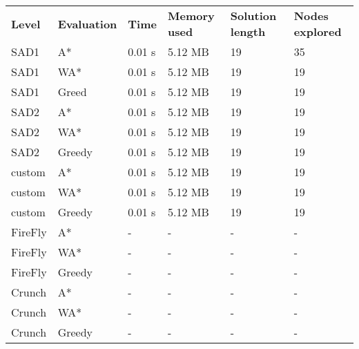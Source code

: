 \documentclass[Main]{subfiles}
\begin{document}
\begin{table}[h]
\begin{tabular}{llllll}
\rowcolor[HTML]{EFEFEF} 
\textbf{Level} & \textbf{Evaluation} & \textbf{Time} & \textbf{Memory used} & \textbf{Solution length} & \textbf{Nodes explored} \\
SAD1           & A*                  & 0.01 s        & 5.12 MB              & 19                       & 35                      \\
SAD1           & WA*                 & 0.01 s        & 5.12 MB              & 19                       & 19                      \\
SAD1           & Greed               & 0.01 s        & 5.12 MB              & 19                       & 19                      \\
SAD2           & A*                  & 0.01 s        & 5.12 MB              & 19                       & 19                      \\
SAD2           & WA*                 & 0.01 s        & 5.12 MB              & 19                       & 19                      \\
SAD2           & Greedy              & 0.01 s        & 5.12 MB              & 19                       & 19                      \\
custom         & A*                  & 0.01 s        & 5.12 MB              & 19                       & 19                      \\
custom         & WA*                 & 0.01 s        & 5.12 MB              & 19                       & 19                      \\
custom         & Greedy              & 0.01 s        & 5.12 MB              & 19                       & 19                      \\
FireFly        & A*                  & -           & -                  & -                      & -                     \\
FireFly        & WA*                 & -           & -                  & -                      & -                     \\
FireFly        & Greedy              & -           & -                  & -                      & -                     \\
Crunch         & A*                  & -           & -                  & -                      & -                     \\
Crunch         & WA*                 & -           & -                  & -                      & -                     \\
Crunch         & Greedy              & -           & -                  & -                      & -                     
\end{tabular}
\end{table}
\end{document}
